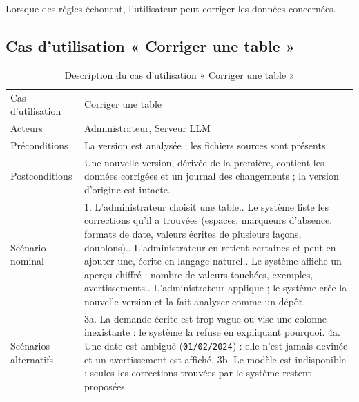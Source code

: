 Lorsque des règles échouent, l'utilisateur peut corriger les données concernées.

\subsection{Cas d'utilisation « Corriger une table »}


\begin{table}[H]
\centering
\small
\begin{tabular}{|L{3.4cm}|L{10.6cm}|}
\hline
{} &  \\ \hline
Cas d'utilisation & Corriger une table \\ \hline
Acteurs & Administrateur, Serveur LLM \\ \hline
Préconditions & La version est analysée ; les fichiers sources sont présents. \\ \hline
Postconditions & Une nouvelle version, dérivée de la première, contient les données corrigées et un journal des changements ; la version d'origine est intacte. \\ \hline
Scénario nominal &
1. L'administrateur choisit une table.. Le système liste les corrections qu'il a trouvées (espaces, marqueurs d'absence, formats de date, valeurs écrites de plusieurs façons, doublons).. L'administrateur en retient certaines et peut en ajouter une, écrite en langage naturel.. Le système affiche un aperçu chiffré : nombre de valeurs touchées, exemples, avertissements.. L'administrateur applique ; le système crée la nouvelle version et la fait analyser comme un dépôt. \\ \hline
Scénarios alternatifs &
3a. La demande écrite est trop vague ou vise une colonne inexistante : le système la refuse en expliquant pourquoi.\newline
4a. Une date est ambiguë (\texttt{01/02/2024}) : elle n'est jamais devinée et un avertissement est affiché.\newline
3b. Le modèle est indisponible : seules les corrections trouvées par le système restent proposées. \\ \hline
\end{tabular}
\caption{Description du cas d'utilisation « Corriger une table »}
\label{tab:cu-corriger}
\end{table}

